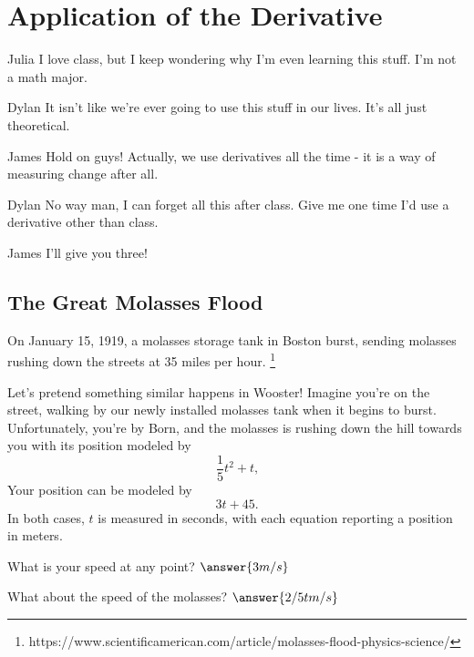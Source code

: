 \documentclass[handout]{ximera}
\begin{document}
\section{Application of the Derivative}
\begin{dialogue}
\item[Julia] I love class, but I keep wondering why I'm even learning this stuff. I'm not a math major.
\item[Dylan] It isn't like we're ever going to use this stuff in our lives. It's all just theoretical.
\item[James] Hold on guys! Actually, we use derivatives all the time - it is a way of measuring change after all.
\item[Dylan] No way man, I can forget all this after class. Give me one time I'd use a derivative other than class.
\item[James] I'll give you three!
\end{dialogue}
\subsection{The Great Molasses Flood}
On January 15, 1919, a molasses storage tank in Boston burst, sending molasses rushing down the streets at 35 miles per hour. \footnote{https://www.scientificamerican.com/article/molasses-flood-physics-science/}

Let's pretend something similar happens in Wooster! Imagine you're on the street, walking by our newly installed molasses tank when it begins to burst. Unfortunately, you're by Born, and the molasses is rushing down the hill towards you with its position modeled by $$\frac{1}{5}t^2+t \text{,}$$ Your position can be modeled by $$3t+45 \text{.}$$ In both cases, $t$ is measured in seconds, with each equation reporting a position in meters.

\setcounter{problem}{0}
\begin{question}
What is your speed at any point?  $\answer{3 m/s}$
\end{question}
\begin{question}
What about the speed of the molasses? $\answer{2/5 t m/s}$
\end{question}
\end{document}
